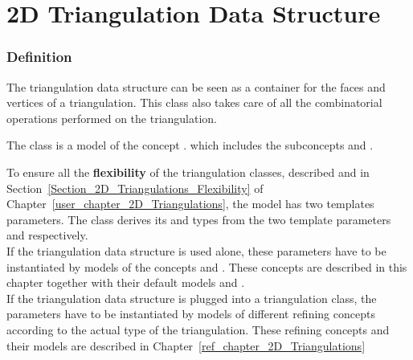 

\chapter{2D Triangulation Data Structure}
\label{ref_chapter_2D_Triangulation_Data_Structure}

\subsection*{Definition}
The triangulation data structure can be seen as a container
for the faces and vertices of a triangulation. This class also takes care
of all the combinatorial operations performed on  the triangulation.

The class 
is  a model of the concept .
which includes the subconcepts
and .

To ensure all the \textbf{flexibility} of  the triangulation
classes, 
described 
and in Section~\ref{Section_2D_Triangulations_Flexibility}
of
Chapter~\ref{user_chapter_2D_Triangulations}, the  model 
has two templates parameters.
The class 
derives its  and  types 
from the two template parameters  and  respectively. \\
If the triangulation data structure
is used alone, these parameters 
have to be instantiated by models
of the concepts  and 
. These concepts
are described in this chapter together with their
default models 
and  . \\
If the triangulation data structure
is plugged into a triangulation class, the parameters
have to be instantiated by models of different 
refining concepts according to the actual type of the triangulation.
These refining concepts and their models
are described in Chapter~\ref{ref_chapter_2D_Triangulations}


